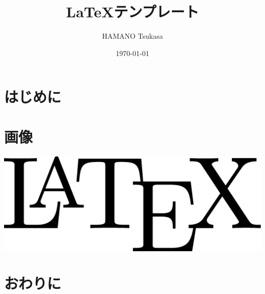 \documentclass[a4paper,onecolumn,12pt,uplatex]{jsarticle}
\title{\LaTeX テンプレート}
\author{HAMANO Tsukasa}
\date{\today}
\begin{document}
\maketitle
\vspace{1em}
\tableofcontents
\clearpage

\section{はじめに}
\lipsum[1]

\section{画像}
\includegraphics[width=\textwidth]{latex.eps}

\section{おわりに}
\lipsum[2]
\end{document}

